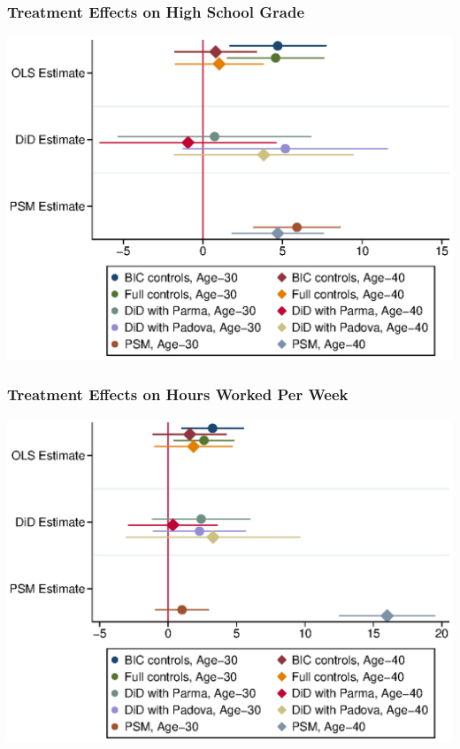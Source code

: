 \begin{frame}
	\frametitle{Treatment Effects on High School Grade} 
	\includegraphics[scale=0.8]{../../../output/image/coefplot-votoMaturita-adult.eps}
\end{frame}

\begin{frame}
	\frametitle{Treatment Effects on Hours Worked Per Week} 
		\includegraphics[scale=0.8]{../../../output/image/coefplot-HrsTot-adult.eps}
\end{frame}

